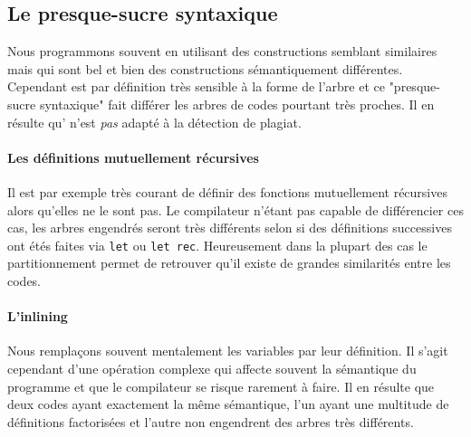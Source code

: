 
\subsection{Le presque-sucre syntaxique}

Nous programmons souvent en utilisant des constructions semblant
similaires mais qui sont bel et bien des constructions sémantiquement
différentes. Cependant {\Asak} est par définition très sensible à la
forme de l'arbre {\LambdaCode} et ce "presque-sucre syntaxique" fait
différer les arbres de codes pourtant très proches. Il en résulte
qu'{\Asak} n'est \emph{pas} adapté à la détection de plagiat.

\paragraph{Les définitions mutuellement récursives}

Il est par exemple très courant de définir des fonctions mutuellement
récursives alors qu'elles ne le sont pas. Le compilateur n'étant pas
capable de différencier ces cas, les arbres engendrés seront très
différents selon si des définitions successives ont étés faites via
\verb|let| ou \verb|let rec|. Heureusement dans la plupart des cas le partitionnement permet de retrouver qu'il existe de grandes similarités entre les codes.

\paragraph{L'inlining}

Nous remplaçons souvent mentalement les variables par leur
définition. Il s'agit cependant d'une opération complexe qui affecte
souvent la sémantique du programme et que le compilateur se risque
rarement à faire. Il en résulte que deux codes ayant exactement la
même sémantique, l'un ayant une multitude de définitions factorisées
et l'autre non engendrent des arbres très différents.
